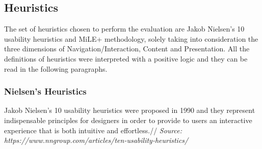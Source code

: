 
\subsection{Heuristics}
The set of heuristics chosen to perform the evaluation are Jakob Nielsen's 10 usability heuristics and MiLE+ methodology, solely taking into consideration the three dimensions of Navigation/Interaction, Content and Presentation. All the definitions of heuristics were interpreted with a positive logic and they can be read in the following paragraphs.

\subsubsection{Nielsen’s Heuristics}
Jakob Nielsen’s 10 usability heuristics were proposed in 1990 and they represent indispensable principles for designers in order to provide to users an interactive experience that is both intuitive and effortless.//
\textit{Source: https://www.nngroup.com/articles/ten-usability-heuristics/}

